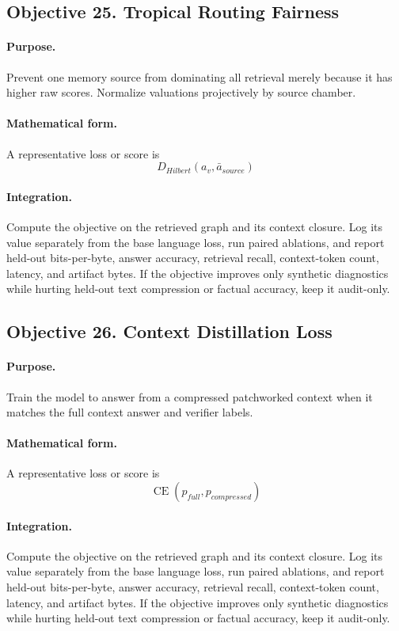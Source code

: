 \documentclass[11pt]{article}
\theoremstyle{definition}
\theoremstyle{remark}
\begin{document}
\subsection{Objective 25. Tropical Routing Fairness}
\paragraph{Purpose.} Prevent one memory source from dominating all retrieval merely because it has higher raw scores. Normalize valuations projectively by source chamber.

\paragraph{Mathematical form.} A representative loss or score is
\[
    D_{Hilbert}(a_v,\bar a_{source})
\]

\paragraph{Integration.} Compute the objective on the retrieved graph and its context closure. Log its value separately from the base language loss, run paired ablations, and report held-out bits-per-byte, answer accuracy, retrieval recall, context-token count, latency, and artifact bytes. If the objective improves only synthetic diagnostics while hurting held-out text compression or factual accuracy, keep it audit-only.


\subsection{Objective 26. Context Distillation Loss}
\paragraph{Purpose.} Train the model to answer from a compressed patchworked context when it matches the full context answer and verifier labels.

\paragraph{Mathematical form.} A representative loss or score is
\[
    \operatorname{CE}(p_{full},p_{compressed})
\]

\paragraph{Integration.} Compute the objective on the retrieved graph and its context closure. Log its value separately from the base language loss, run paired ablations, and report held-out bits-per-byte, answer accuracy, retrieval recall, context-token count, latency, and artifact bytes. If the objective improves only synthetic diagnostics while hurting held-out text compression or factual accuracy, keep it audit-only.
\end{document}
